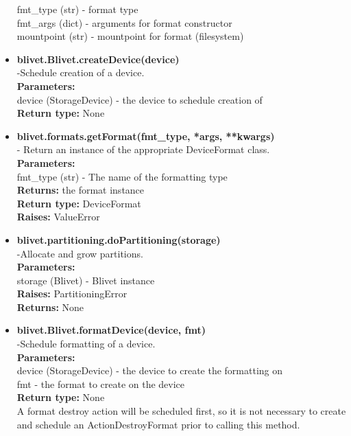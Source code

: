 \documentclass{article}
\begin{document}
\begin{itemize}
       fmt\_type (str) - format type\\
       fmt\_args (dict) - arguments for format constructor\\
       mountpoint (str) - mountpoint for format (filesystem)\\
\item \textbf{blivet.Blivet.createDevice(device)}\\ -Schedule creation of a device.\\
    \textbf{Parameters:}\\	device (StorageDevice) - the device to schedule creation of\\
    \textbf{Return type:}	None\\
\item \textbf{blivet.formats.getFormat(fmt\_type, *args, **kwargs)}\\- Return an
instance of the appropriate DeviceFormat class.\\
    \textbf{Parameters:}	\\fmt\_type (str) - The name of the formatting type\\
    \textbf{Returns:}	the format instance\\
    \textbf{Return type:}	DeviceFormat\\
    \textbf{Raises:}	ValueError\\
\item \textbf{blivet.partitioning.doPartitioning(storage)}\\-Allocate and grow
partitions.\\
    \textbf{Parameters:}	\\storage (Blivet) - Blivet instance\\
    \textbf{Raises:}	PartitioningError\\
    \textbf{Returns:}	None\\
\item \textbf{blivet.Blivet.formatDevice(device, fmt)}\\-Schedule formatting of a device.\\
    \textbf{Parameters:}	\\
        device (StorageDevice) - the device to create the formatting on\\
        fmt - the format to create on the device\\
    \textbf{Return type:}	None\\
    A format destroy action will be scheduled first, so it is not necessary to
create and schedule an ActionDestroyFormat prior to calling this method.\\

\end{itemize}
\end{document}
